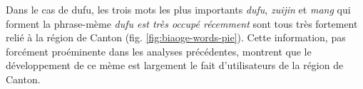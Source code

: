 Dans le cas de dufu, les trois mots les plus importants \textit{dufu}, \textit{zuijin} et \textit{mang} qui forment la phrase-m\`eme \textit{dufu est tr\`es occup\'e r\'ecemment }sont tous tr\`es fortement reli\'e \`a la r\'egion de Canton (fig. \ref{fig:biaoge-words-pie}). Cette information, pas forc\'ement pro\'eminente dans les analyses pr\'ec\'edentes, montrent que le d\'eveloppement de ce m\`eme est largement le fait d{\textquoteright}utilisateurs de la r\'egion de Canton. 